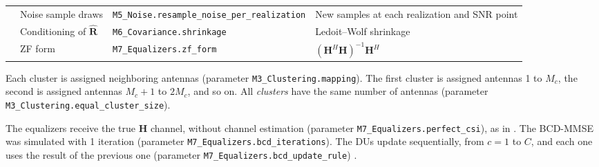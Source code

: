 \begin{table}[htbp]
\begin{tabular}{|p{2.3cm}|p{3.4cm}|p{4.3cm}|p{3.2cm}|}
\cline{2-4}
 & \raggedright Noise sample draws & \raggedright \texttt{M5\_\allowbreak{}Noise.\allowbreak resample\_\allowbreak{}noise\_\allowbreak{}per\_\allowbreak{}realization} & \raggedright New samples at each realization and SNR point \tabularnewline
\cline{2-4}
 & \raggedright Conditioning of $\hat{\mathbf{R}}$ & \raggedright \texttt{M6\_\allowbreak{}Covariance.\allowbreak shrinkage} & \raggedright Ledoit--Wolf shrinkage \tabularnewline
\cline{2-4}
 & \raggedright ZF form & \raggedright \texttt{M7\_\allowbreak{}Equalizers.\allowbreak zf\_\allowbreak{}form} & \raggedright $(\mathbf{H}^H\mathbf{H})^{-1}\mathbf{H}^H$ \tabularnewline
\bottomrule
\end{tabular}
\vspace{4pt}
\end{table}


Each cluster is assigned neighboring antennas (parameter \texttt{M3\_Clustering.mapping}). The first cluster is assigned antennas 1 to $M_c$, the second is assigned antennas $M_c+1$ to $2M_c$, and so on. All \textit{clusters} have the same number of antennas (parameter \texttt{M3\_Clustering.equal\_cluster\_size}).

The equalizers receive the true $\mathbf{H}$ channel, without channel estimation (parameter \texttt{M7\_Equalizers.perfect\_csi}), as in \cite{zhao2025jsac}. The BCD-MMSE was simulated with 1 iteration (parameter \texttt{M7\_Equalizers.bcd\_iterations}). The DUs update sequentially, from $c = 1$ to $C$, and each one uses the result of the previous one (parameter \texttt{M7\_Equalizers.bcd\_update\_rule}) \cite{zhao2025jsac}.

